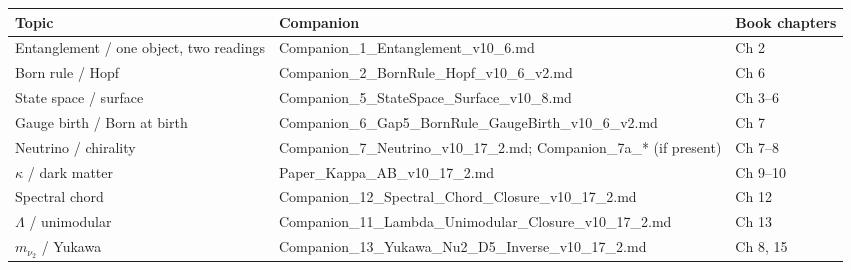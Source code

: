 \documentclass[
  11pt,
]{article}
\newcounter{none} %
\begin{document}
{\def\LTcaptype{none} %
\begin{longtable}[]{@{}
  >{\raggedright\arraybackslash}p{}
  >{\raggedright\arraybackslash}p{}
  >{\raggedright\arraybackslash}p{}@{}}
\toprule\noalign{}
\begin{minipage}[b]{\linewidth}\raggedright
Topic
\end{minipage} & \begin{minipage}[b]{\linewidth}\raggedright
Companion
\end{minipage} & \begin{minipage}[b]{\linewidth}\raggedright
Book chapters
\end{minipage} \\
\midrule\noalign{}
\endhead
\bottomrule\noalign{}
\endlastfoot
Entanglement /\allowbreak{} one object, two readings &
Companion\_\allowbreak{}1\_\allowbreak{}Entanglement\_\allowbreak{}v10\_\allowbreak{}6.md
& Ch 2 \\
Born rule /\allowbreak{} Hopf &
Companion\_\allowbreak{}2\_\allowbreak{}BornRule\_\allowbreak{}Hopf\_\allowbreak{}v10\_\allowbreak{}6\_\allowbreak{}v2.md
& Ch 6 \\
State space /\allowbreak{} surface &
Companion\_\allowbreak{}5\_\allowbreak{}StateSpace\_\allowbreak{}Surface\_\allowbreak{}v10\_\allowbreak{}8.md
& Ch 3--6 \\
Gauge birth /\allowbreak{} Born at birth &
Companion\_\allowbreak{}6\_\allowbreak{}Gap5\_\allowbreak{}BornRule\_\allowbreak{}GaugeBirth\_\allowbreak{}v10\_\allowbreak{}6\_\allowbreak{}v2.md
& Ch 7 \\
Neutrino /\allowbreak{} chirality &
Companion\_\allowbreak{}7\_\allowbreak{}Neutrino\_\allowbreak{}v10\_\allowbreak{}17\_\allowbreak{}2.md;
Companion\_\allowbreak{}7a\_\allowbreak{}* (if present) & Ch 7--8 \\
\(\kappa\) /\allowbreak{} dark matter &
Paper\_\allowbreak{}Kappa\_\allowbreak{}AB\_\allowbreak{}v10\_\allowbreak{}17\_\allowbreak{}2.md
& Ch 9--10 \\
Spectral chord &
Companion\_\allowbreak{}12\_\allowbreak{}Spectral\_\allowbreak{}Chord\_\allowbreak{}Closure\_\allowbreak{}v10\_\allowbreak{}17\_\allowbreak{}2.md
& Ch 12 \\
\(\Lambda\) /\allowbreak{} unimodular &
Companion\_\allowbreak{}11\_\allowbreak{}Lambda\_\allowbreak{}Unimodular\_\allowbreak{}Closure\_\allowbreak{}v10\_\allowbreak{}17\_\allowbreak{}2.md
& Ch 13 \\
\(m_{\nu_2}\) /\allowbreak{} Yukawa &
Companion\_\allowbreak{}13\_\allowbreak{}Yukawa\_\allowbreak{}Nu2\_\allowbreak{}D5\_\allowbreak{}Inverse\_\allowbreak{}v10\_\allowbreak{}17\_\allowbreak{}2.md
& Ch 8, 15 \\
\end{longtable}
}
\end{document}
